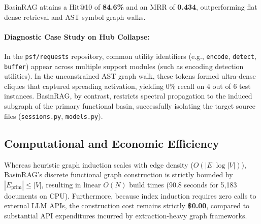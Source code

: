 \documentclass[10pt,twocolumn]{article}
\theoremstyle{definition}
\begin{document}
\begin{table}[t]
\centering
\caption{Fault localization on Princeton SWE-bench Lite.}
\label{tab:swebench}
\end{table}

BasinRAG attains a Hit@10 of \textbf{84.6\%} and an MRR of \textbf{0.434}, outperforming flat dense retrieval and AST symbol graph walks. 

\paragraph{Diagnostic Case Study on Hub Collapse:} In the \texttt{psf/requests} repository, common utility identifiers (e.g., \texttt{encode}, \texttt{detect}, \texttt{buffer}) appear across multiple support modules (such as encoding detection utilities). In the unconstrained AST graph walk, these tokens formed ultra-dense cliques that captured spreading activation, yielding 0\% recall on 4 out of 6 test instances. BasinRAG, by contrast, restricts spectral propagation to the induced subgraph of the primary functional basin, successfully isolating the target source files (\texttt{sessions.py}, \texttt{models.py}).

\subsection{Computational and Economic Efficiency}

Whereas heuristic graph induction scales with edge density ($O(|E| \log |V|)$), BasinRAG's discrete functional graph construction is strictly bounded by $|E_{\text{prim}}| \le |V|$, resulting in linear $O(N)$ build times (90.8 seconds for 5,183 documents on CPU). Furthermore, because index induction requires zero calls to external LLM APIs, the construction cost remains strictly \textbf{\$0.00}, compared to substantial API expenditures incurred by extraction-heavy graph frameworks.
\end{document}
